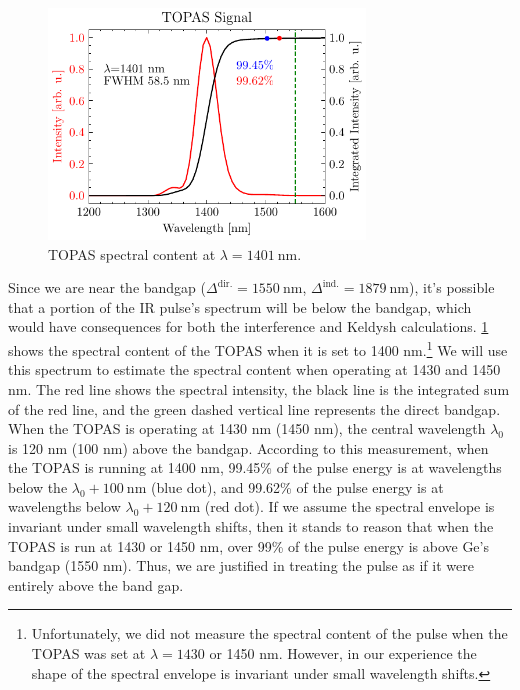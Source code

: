 \begin{figure}
	\centering
	\includegraphics[width=0.75\textwidth]{figures/chap4/TOPAS_1400nm_spectral_inten.pdf}
	\caption{TOPAS spectral content at $\lambda = 1401 \ \textrm{nm}$.}
	\label{fig:TOPAS_1400nm_spectral_inten}
\end{figure}

Since we are near the bandgap ($\Delta^{\textrm{dir.}} = 1550 \ \textrm{nm}$, $\Delta^{\textrm{ind.}} = 1879 \ \textrm{nm}$), it's possible that a portion of the IR pulse's spectrum will be below the bandgap, which would have consequences for both the interference and Keldysh calculations. \cref{fig:TOPAS_1400nm_spectral_inten} shows the spectral content of the TOPAS when it is set to 1400 nm.\footnote{Unfortunately, we did not measure the spectral content of the pulse when the TOPAS was set at $\lambda = 1430$ or 1450 nm. However, in our experience the shape of the spectral envelope is invariant under small wavelength shifts.} We will use this spectrum to estimate the spectral content when operating at 1430 and 1450 nm. The red line shows the spectral intensity, the black line is the integrated sum of the red line, and the green dashed vertical line represents the direct bandgap. When the TOPAS is operating at 1430 nm (1450 nm), the central wavelength $\lambda_0$ is 120 nm (100 nm) above the bandgap. According to this measurement, when the TOPAS is running at 1400 nm, 99.45\% of the pulse energy is at wavelengths below the $\lambda_0 + 100 \ \textrm{nm}$ (blue dot), and 99.62\% of the pulse energy is at wavelengths below $\lambda_0 + 120 \ \textrm{nm}$ (red dot). If we assume the spectral envelope is invariant under small wavelength shifts, then it stands to reason that when the TOPAS is run at 1430 or 1450 nm, over 99\% of the pulse energy is above Ge's bandgap (1550 nm). Thus, we are justified in treating the pulse as if it were entirely above the band gap.


